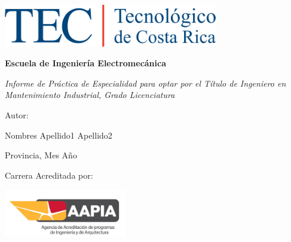 \begin{titlepage}

\centering

{\includegraphics[width=0.7\textwidth]{Figuras/logo.png}\par}
\vspace{0.5cm}

{\bfseries\LARGE Escuela de Ingeniería Electromecánica\par}
\vspace{0.5cm}



\vfill

{\scshape\LARGE \lipsum[4][1-3] \par}
\vspace{1cm}

{\itshape\Large Informe de Práctica de Especialidad para optar por el Título de
Ingeniero en Mantenimiento Industrial, Grado Licenciatura \par}
\vspace{1cm}

{\Large Autor: \par}
{\Large Nombres Apellido1 Apellido2  \par}
\vspace{0.6cm}

{\Large Provincia, Mes Año \par}

\vspace{0.5cm}

{\Large Carrera Acreditada por: \par}
{\includegraphics[width=0.4\textwidth]{Figuras/AAPIA.png}\par}



\end{titlepage}
